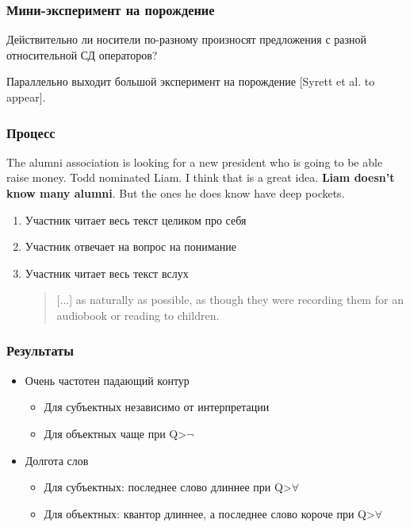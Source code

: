 \documentclass{beamer}
\begin{document}
\begin{frame}
    \frametitle{Мини-эксперимент на порождение}

    Действительно ли носители по-разному произносят предложения с разной относительной СД операторов?

    Параллельно выходит большой эксперимент на порождение [Syrett et al. to appear].

\end{frame}

\begin{frame}
    \frametitle{Процесс}

    {\small The alumni association is looking for a new president who is going to be
    able raise money. Todd nominated Liam. I think that is a great idea. \textbf{Liam
    doesn’t know many alumni}. But the ones he does know have deep
    pockets.}

    \begin{enumerate}
        \item Участник читает весь текст целиком про себя
        \item Участник отвечает на вопрос на понимание
        \item Участник читает весь текст вслух\\
            \begin{quote}
                [...] as naturally as possible, as though they were recording them for an audiobook or reading to children.
            \end{quote}
    \end{enumerate}

\end{frame}

\begin{frame}
    \frametitle{Результаты}

    \begin{itemize}
        \item Очень частотен падающий контур
        \begin{itemize}
            \item Для субъектных независимо от интерпретации
            \item Для объектных чаще при Q>$\neg$
        \end{itemize}
        
        \item Долгота слов
        \begin{itemize}
            \item Для субъектных: последнее слово длиннее при Q>$\forall$
            \item Для объектных: квантор длиннее, а последнее слово короче при Q>$\forall$
        \end{itemize}
    \end{itemize}
\end{frame}
\end{document}
